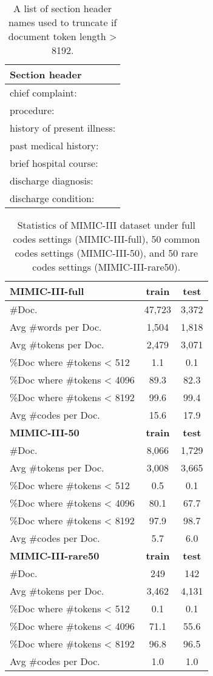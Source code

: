 \documentclass[11pt]{article}
\begin{document}
\begin{table}[ht]
\centering
\begin{tabular}{l}\toprule
Section header \\\midrule
chief complaint: \\
procedure: \\
history of present illness: \\
past medical history: \\
brief hospital course: \\
discharge diagnosis: \\
discharge condition: \\
\bottomrule
\end{tabular}
\caption{A list of section header names used to truncate if document token length > 8192.}\label{tab:header}
\end{table}


\begin{table}[ht]
\centering
\begin{tabular}{lcc}
\hline
\textbf{MIMIC-III-full} & \textbf{train} & \textbf{test}\\
\hline
\#Doc. & 47,723 & 3,372 \\
Avg \#words per Doc. & 1,504 & 1,818 \\
Avg \#tokens per Doc. & 2,479 & 3,071 \\
\%Doc where \#tokens < 512 & 1.1 & 0.1  \\
\%Doc where \#tokens < 4096 & 89.3 & 82.3  \\
\%Doc where \#tokens < 8192 & 99.6 & 99.4 \\
Avg \#codes per Doc. & 15.6 & 17.9 \\ 
\hline
\textbf{MIMIC-III-50} & \textbf{train} & \textbf{test}\\
\hline
\#Doc. & 8,066 & 1,729 \\
Avg \#tokens per Doc. & 3,008 & 3,665 \\
\%Doc where \#tokens < 512 & 0.5 & 0.1  \\
\%Doc where \#tokens < 4096 & 80.1 & 67.7  \\
\%Doc where \#tokens < 8192 & 97.9 & 98.7 \\
Avg \#codes per Doc. & 5.7 & 6.0 \\ 
\hline
\textbf{MIMIC-III-rare50} & \textbf{train} & \textbf{test}\\
\hline
\#Doc. & 249 & 142 \\
Avg \#tokens per Doc. & 3,462 & 4,131 \\
\%Doc where \#tokens < 512 & 0.1 & 0.1  \\
\%Doc where \#tokens < 4096 & 71.1 & 55.6  \\
\%Doc where \#tokens < 8192 & 96.8 & 96.5\\
Avg \#codes per Doc. & 1.0 & 1.0 \\ 
\hline
\end{tabular}
\caption{Statistics of MIMIC-III dataset under full codes settings (MIMIC-III-full), 50 common codes settings (MIMIC-III-50), and 50 rare codes settings (MIMIC-III-rare50).} \label{tab:data}
\end{table}
\end{document}
